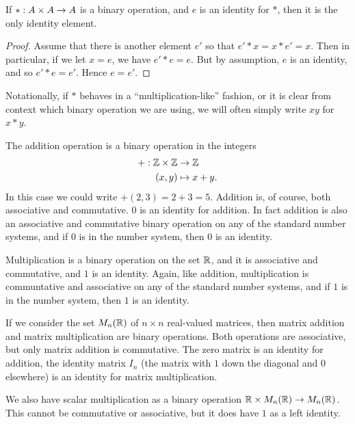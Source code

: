 \begin{lemma}
  If $\ast: A \times A \to A$ is a binary operation, and $e$ is an identity for
  $\ast$, then it is the only identity element.
\end{lemma}
\begin{proof}
  Assume that there is another element $e'$ so that $e' \ast x = x \ast e' =
x$.  Then in particular, if we let $x = e$, we have $e' \ast e = e$.  But by
assumption, $e$ is an identity, and so $e' \ast e = e'$.  Hence $e = e'$.
\end{proof}

Notationally, if $\ast$ behaves in a ``multiplication-like'' fashion, or it
is clear from context which binary operation we are using, we will often simply
write $xy$ for $x \ast y$.

\begin{example}
The addition operation is a binary operation in the integers
\begin{align*}
  + : \mathbb{Z} \times \mathbb{Z} &\to \mathbb{Z}\\
         (x,y) &\mapsto x + y.
\end{align*}
In this case we could write $+(2,3) = 2 + 3 = 5$.  Addition is, of course,
both associative and commutative.  $0$ is an identity for addition.  In fact
addition is also an associative and commutative binary operation on any of the
standard number systems, and if $0$ is in the number system, then $0$ is an
identity.
\end{example}

\begin{example}
Multiplication is a binary operation on the set $\mathbb{R}$, and it is associative
and commutative, and $1$ is an identity.  Again, like addition,
multiplication is communtative and associative on any of the
standard number systems, and if $1$ is in the number system, then $1$ is an
identity.
\end{example}

\begin{example}
If we consider the set $M_{n}(\mathbb{R})$ of $n \times n$ real-valued matrices,
then matrix addition and matrix multiplication are binary operations.  Both
operations are associative, but only matrix addition is commutative.  The
zero matrix is an identity for addition, the identity matrix $I_{n}$ (the
matrix with $1$ down the diagonal and $0$ elsewhere) is an identity for matrix
multiplication.

We also have scalar multiplication as a binary operation $\mathbb{R} \times
M_{n}(\mathbb{R}) \to M_{n}(\mathbb{R})$.  This cannot be commutative or
associative, but it does have $1$ as a left identity.
\end{example}


